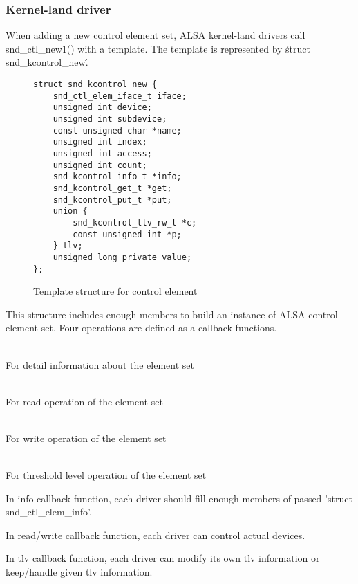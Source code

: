 \documentclass[onecolumn]{article}
\begin{document}
\subsubsection{Kernel-land driver}

When adding a new control element set, ALSA kernel-land drivers call snd\_ctl\_new1() with a template. The template is represented by \'struct snd\_kcontrol\_new\'.

\begin{figure}[htbp]
\small
\begin{verbatim}
struct snd_kcontrol_new {
    snd_ctl_elem_iface_t iface;
    unsigned int device;
    unsigned int subdevice;
    const unsigned char *name;
    unsigned int index;
    unsigned int access;
    unsigned int count;
    snd_kcontrol_info_t *info;
    snd_kcontrol_get_t *get;
    snd_kcontrol_put_t *put;
    union {
        snd_kcontrol_tlv_rw_t *c;
        const unsigned int *p;
    } tlv;
    unsigned long private_value;
};
\end{verbatim}
\caption{{Template structure for control element}}
\label{control-element-template}
\end{figure}

This structure includes enough members to build an instance of ALSA control element set. Four operations are defined as a callback functions.

\begin{description}
\small
\item[snd\_kcontrol\_info\_t] \mbox{} \\
For detail information about the element set
\item[snd\_kcontrol\_get\_t] \mbox{} \\
For read operation of the element set
\item[snd\_kcontrol\_put\_t] \mbox{} \\
For write operation of the element set
\item[snd\_kctl\_tlv\_rw\_t] \mbox{} \\
For threshold level operation of the element set
\end{description}

In info callback function, each driver should fill enough members of passed 'struct snd\_ctl\_elem\_info'.

In read/write callback function, each driver can control actual devices.

In tlv callback function, each driver can modify its own tlv information or keep/handle given tlv information.
\end{document}
